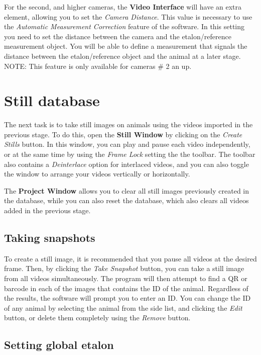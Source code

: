 \documentclass[10pt,a4paper,oneside]{report}             %
\begin{document}
For the second, and higher cameras, the \textbf{Video Interface} will have an extra element, allowing you to set the \textit{Camera Distance}. This value is necessary to use the \textit{Automatic Measurement Correction} feature of the software. In this setting you need to set the distance between the camera and the etalon/reference measurement object. You will be able to define a measurement that signals the distance between the etalon/reference object and the animal at a later stage. NOTE: This feature is only available for cameras \# 2 an up. 

\section{Still database}

The next task is to take still images on animals using the videos imported in the previous stage. To do this, open the \textbf{Still Window} by clicking on the \textit{Create Stills} button. In this window, you can play and pause each video independently, or at the same time by using the \textit{Frame Lock} setting the the toolbar. The toolbar also contains a \textit{Deinterlace} option for interlaced videos, and you can also toggle the window to arrange your videos vertically or horizontally.

The \textbf{Project Window} allows you to clear all still images previously created in the database, while you can also reset the database, which also clears all videos added in the previous stage.

\subsection{Taking snapshots}

To create a still image, it is recommended that you pause all videos at the desired frame. Then, by clicking the \textit{Take Snapshot} button, you can take a still image from all videos simultaneously. The program will then attempt to find a QR or barcode in each of the images that contains the ID of the animal. Regardless of the results, the software will prompt you to enter an ID. You can change the ID of any animal by selecting the animal from the side list, and clicking the \textit{Edit} button, or delete them completely using the \textit{Remove} button.

\subsection{Setting global etalon}
\end{document}
